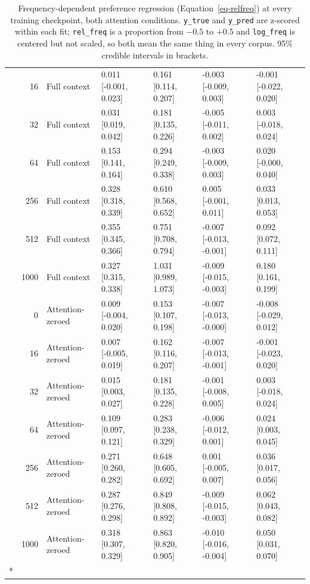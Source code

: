 \documentclass[11pt]{article}
\begin{document}
\begin{longtable}[t]{lrlllll}
\nopagebreak
 & 16 & Full context & 0.011 [-0.001, 0.023] & 0.161 [0.114, 0.207] & -0.003 [-0.009, 0.003] & -0.001 [-0.022, 0.020]\\
\nopagebreak
 & 32 & Full context & 0.031 [0.019, 0.042] & 0.181 [0.135, 0.226] & -0.005 [-0.011, 0.002] & 0.003 [-0.018, 0.024]\\
\nopagebreak
 & 64 & Full context & 0.153 [0.141, 0.164] & 0.294 [0.249, 0.338] & -0.003 [-0.009, 0.003] & 0.020 [-0.000, 0.040]\\
\nopagebreak
 & 256 & Full context & 0.328 [0.318, 0.339] & 0.610 [0.568, 0.652] & 0.005 [-0.001, 0.011] & 0.033 [0.013, 0.053]\\
\nopagebreak
 & 512 & Full context & 0.355 [0.345, 0.366] & 0.751 [0.708, 0.794] & -0.007 [-0.013, -0.001] & 0.092 [0.072, 0.111]\\
\nopagebreak
 & 1000 & Full context & 0.327 [0.315, 0.338] & 1.031 [0.989, 1.073] & -0.009 [-0.015, -0.003] & 0.180 [0.161, 0.199]\\
\nopagebreak
 & 0 & Attention-zeroed & 0.009 [-0.004, 0.020] & 0.153 [0.107, 0.198] & -0.007 [-0.013, -0.000] & -0.008 [-0.029, 0.012]\\
\nopagebreak
 & 16 & Attention-zeroed & 0.007 [-0.005, 0.019] & 0.162 [0.116, 0.207] & -0.007 [-0.013, -0.001] & -0.001 [-0.023, 0.020]\\
\nopagebreak
 & 32 & Attention-zeroed & 0.015 [0.003, 0.027] & 0.181 [0.135, 0.228] & -0.001 [-0.008, 0.005] & 0.003 [-0.018, 0.024]\\
\nopagebreak
 & 64 & Attention-zeroed & 0.109 [0.097, 0.121] & 0.283 [0.238, 0.329] & -0.006 [-0.012, 0.001] & 0.024 [0.003, 0.045]\\
\nopagebreak
 & 256 & Attention-zeroed & 0.271 [0.260, 0.282] & 0.648 [0.605, 0.692] & 0.001 [-0.005, 0.007] & 0.036 [0.017, 0.056]\\
\nopagebreak
 & 512 & Attention-zeroed & 0.287 [0.276, 0.298] & 0.849 [0.808, 0.892] & -0.009 [-0.015, -0.003] & 0.062 [0.043, 0.082]\\
\nopagebreak
\multirow{-14}{*}{\raggedright\arraybackslash Pythia-1B} & 1000 & Attention-zeroed & 0.318 [0.307, 0.329] & 0.863 [0.820, 0.905] & -0.010 [-0.016, -0.004] & 0.050 [0.031, 0.070]\\*
\bottomrule


\caption{\label{tbl-relfreq-checkpoints}Frequency-dependent preference
regression (Equation~\ref{eq-relfreq}) at every training checkpoint,
both attention conditions. \texttt{y\_true} and \texttt{y\_pred} are
z-scored within each fit; \texttt{rel\_freq} is a proportion from
\(-0.5\) to \(+0.5\) and \texttt{log\_freq} is centered but not scaled,
so both mean the same thing in every corpus. 95\% credible intervals in
brackets.}

\tabularnewline
\end{longtable}
\end{document}

